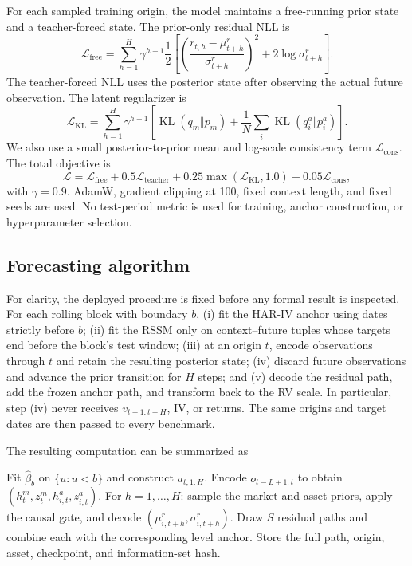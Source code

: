 \documentclass[11pt]{article}
\begin{document}
For each sampled training origin, the model maintains a free-running prior state and a teacher-forced state. The prior-only residual NLL is
\begin{equation}
\mathcal L_{\mathrm{free}}=\sum_{h=1}^H\gamma^{h-1}\frac12\left[\left(\frac{r_{t,h}-\mu^r_{t+h}}{\sigma^r_{t+h}}\right)^2+2\log\sigma^r_{t+h}\right].
\end{equation}
The teacher-forced NLL uses the posterior state after observing the actual future observation. The latent regularizer is
\begin{equation}
\mathcal L_{\mathrm{KL}}=\sum_{h=1}^H\gamma^{h-1}\left[\operatorname{KL}(q_m\Vert p_m)+\frac{1}{N}\sum_i\operatorname{KL}(q_{i}^a\Vert p_i^a)\right].
\end{equation}
We also use a small posterior-to-prior mean and log-scale consistency term $\mathcal L_{\mathrm{cons}}$. The total objective is
\begin{equation}
 \mathcal L=\mathcal L_{\mathrm{free}}+0.5\mathcal L_{\mathrm{teacher}}+0.25\max(\mathcal L_{\mathrm{KL}},1.0)+0.05\mathcal L_{\mathrm{cons}},
 \label{eq:loss}
\end{equation}
with $\gamma=0.9$. AdamW, gradient clipping at 100, fixed context length, and fixed seeds are used. No test-period metric is used for training, anchor construction, or hyperparameter selection.

\subsection{Forecasting algorithm}
For clarity, the deployed procedure is fixed before any formal result is inspected. For each rolling block with boundary $b$, (i) fit the HAR-IV anchor using dates strictly before $b$; (ii) fit the RSSM only on context--future tuples whose targets end before the block's test window; (iii) at an origin $t$, encode observations through $t$ and retain the resulting posterior state; (iv) discard future observations and advance the prior transition for $H$ steps; and (v) decode the residual path, add the frozen anchor path, and transform back to the RV scale. In particular, step (iv) never receives $v_{t+1:t+H}$, IV, or returns. The same origins and target dates are then passed to every benchmark.

The resulting computation can be summarized as
\begin{algorithmic}
\STATE Fit $\widehat\beta_b$ on $\{u:u<b\}$ and construct $a_{t,1:H}$.
\STATE Encode $o_{t-L+1:t}$ to obtain $(h_t^m,z_t^m,h_{i,t}^a,z_{i,t}^a)$.
\STATE For $h=1,\ldots,H$: sample the market and asset priors, apply the causal gate, and decode $(\mu^r_{i,t+h},\sigma^r_{i,t+h})$.
\STATE Draw $S$ residual paths and combine each with the corresponding level anchor.
\STATE Store the full path, origin, asset, checkpoint, and information-set hash.
\end{algorithmic}
\end{document}
